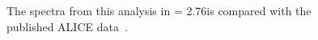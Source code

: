 \documentclass[ALICE,manyauthors]{ALICE_internal_notes}
\begin{document}
\begin{figure}[p]
  \centering
  \caption{The spectra from this analysis in \pp{} \s = 2.76\tev  is compared with the published ALICE data~\cite{Abelev:2013ala}.
 }
  \label{fig:spectra_LHC11a}
\end{figure}
\end{document}

